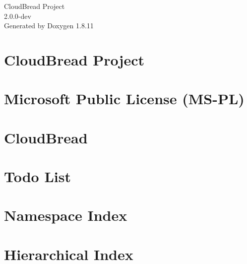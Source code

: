 \documentclass[twoside]{book}
\newcommand{\+}{\discretionary{\mbox{\scriptsize$\hookleftarrow$}}{}{}}
\newcommand{\clearemptydoublepage}{%
  \newpage{\pagestyle{empty}\cleardoublepage}%
}
\begin{document}
\hypersetup{pageanchor=false,
             bookmarksnumbered=true,
             pdfencoding=unicode
            }
\begin{titlepage}
\vspace*{7cm}
\begin{center}%
{\Large Cloud\+Bread Project \\[1ex]\large 2.\+0.\+0-\/dev }\\
\vspace*{1cm}
{\large Generated by Doxygen 1.8.11}\\
\end{center}
\end{titlepage}
\clearemptydoublepage
\tableofcontents
\clearemptydoublepage
{}
\hypersetup{pageanchor=true}

\chapter{Cloud\+Bread Project}
\label{index}\hypertarget{index}{}
\chapter{Microsoft Public License (M\+S-\/\+PL)}
\label{md_C:_Users_dwkim_Documents_GitHub_CloudBread_packages_RazorEngine.3.4.1_LICENSE}
\hypertarget{md_C:_Users_dwkim_Documents_GitHub_CloudBread_packages_RazorEngine.3.4.1_LICENSE}{}

\chapter{Cloud\+Bread}
\label{md_C:_Users_dwkim_Documents_GitHub_CloudBread_README}
\hypertarget{md_C:_Users_dwkim_Documents_GitHub_CloudBread_README}{}

\chapter{Todo List}
\label{todo}
\hypertarget{todo}{}

\chapter{Namespace Index}

\chapter{Hierarchical Index}

\end{document}
